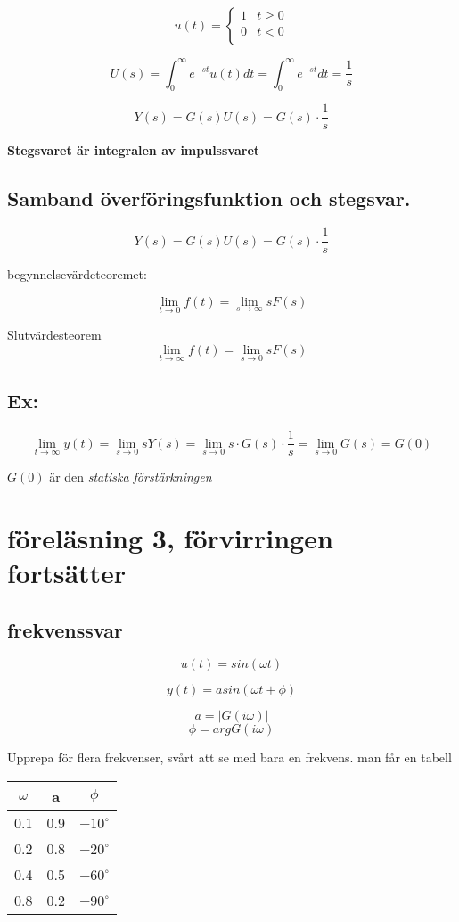\documentclass[12pt]{article} %
\begin{document}
\[
u(t) = 
    \begin{cases}
        1 & t \geq 0\\
        0 & t < 0\\
    \end{cases}
\]

\[
    U(s) = \int^\infty_0 e^{-st} u(t) dt = \int^\infty_0 e^{-st} dt = \frac{1}{s} 
\]

$$Y(s) = G(s)U(s) =G(s) \cdot \frac{1}{s}$$


\textbf{Stegsvaret är integralen av impulssvaret}

\subsection{Samband överföringsfunktion och stegsvar.}

$$Y(s) = G(s)U(s) = G(s) \cdot \frac{1}{s}$$

begynnelsevärdeteoremet:

$$\lim_{t \to 0} f(t) = \lim_{s \to \infty} s F(s)$$

Slutvärdesteorem
$$\lim_{t \to \infty} f(t) = \lim_{s \to 0} s F(s)$$


\subsection{Ex:}

$$\lim_{t \to \infty} y(t) = \lim_{s \to 0} sY(s) = \lim_{s\to0} s \cdot G(s) \cdot \frac{1}{s} = \lim_{s\to0} G(s) = G(0)$$

$G(0)$ är den \textit{statiska förstärkningen}


\section{föreläsning 3, förvirringen fortsätter}

\subsection{frekvenssvar}

$$u(t) = sin(\omega t)$$

$$y(t) = a sin(\omega t + \phi)$$

$$a = |G(i\omega)|$$
$$\phi = arg G(i \omega)$$

Upprepa för flera frekvenser, svårt att se med bara en frekvens.
man får en tabell

\begin{tabular}{c | c |c }
    $\omega$ & a & $\phi$ \\
    \hline
    0.1 & 0.9 & $-10^{\circ}$ \\
    0.2 & 0.8 & $-20^{\circ}$ \\
    0.4 & 0.5 & $-60^{\circ}$\\
    0.8 & 0.2 & $-90^{\circ}$ \\
\end{tabular}
\end{document}
